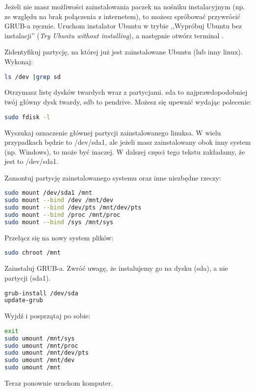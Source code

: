 Jeżeli nie masz możliwości zainstalowania paczek na nośniku instalacyjnym (np. ze względu na brak połączenia z internetem), to możesz spróbować przywrócić GRUB-a ręcznie. Uruchom instalator Ubuntu w trybie ,,Wypróbuj Ubuntu bez instalacji'' (\textit{Try Ubuntu without installing}), a następnie otwórz terminal .

Zidentyfikuj partycję, na której już jest zainstalowane Ubuntu (lub inny linux). Wykonaj:

\begin{lstlisting}[language=bash]
ls /dev |grep sd
\end{lstlisting}

Otrzymasz listę dysków twardych wraz z partycjami. \textcolor{ubuntu_orange}{sda} to najprawdopodobniej twój główny dysk twardy, sdb to pendrive. Możesz się upewnić wydając polecenie:

\begin{lstlisting}[language=bash]
sudo fdisk -l
\end{lstlisting}

Wyszukaj oznaczenie głównej partycji zainstalowanego linuksa. W wielu przypadkach będzie to /dev/sda1, ale jeżeli masz zainstalowany obok inny system (np. Windows), to może być inaczej. W dalszej częsci tego tekstu zakładamy, że jest to /dev/sda1.

Zamontuj partycję zainstalowanego systemu oraz inne niezbędne rzeczy:
\begin{lstlisting}[language=bash]
sudo mount /dev/sda1 /mnt
sudo mount --bind /dev /mnt/dev
sudo mount --bind /dev/pts /mnt/dev/pts
sudo mount --bind /proc /mnt/proc
sudo mount --bind /sys /mnt/sys
\end{lstlisting}

Przełącz się na nowy system plików:

\begin{lstlisting}[language=bash]
sudo chroot /mnt
\end{lstlisting}

Zainstaluj GRUB-a. Zwróć uwagę, że instalujemy go na dysku (sda), a nie partycji (sda1).

\begin{lstlisting}[language=bash]
grub-install /dev/sda
update-grub
\end{lstlisting}

Wyjdź i posprzątaj po sobie:

\begin{lstlisting}[language=bash]
exit
sudo umount /mnt/sys
sudo umount /mnt/proc
sudo umount /mnt/dev/pts
sudo umount /mnt/dev
sudo umount /mnt
\end{lstlisting}

Teraz ponownie uruchom komputer.
\clearpage
